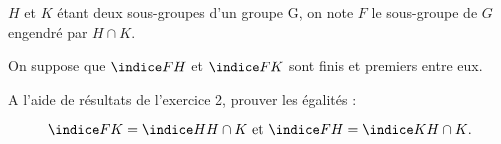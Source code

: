 $H$ et $K$ étant deux sous-groupes d'un groupe G, on note $F$ le sous-groupe de $G$ engendré par $H \cap K$.

On suppose que $\indice F H$ et $\indice F K$ sont finis et premiers entre eux.

A l'aide de résultats de l'exercice 2, prouver les égalités :

\[
\indice F K = \indice H {H \cap K} \text{ et } \indice F H = \indice K {H \cap K}.
\]